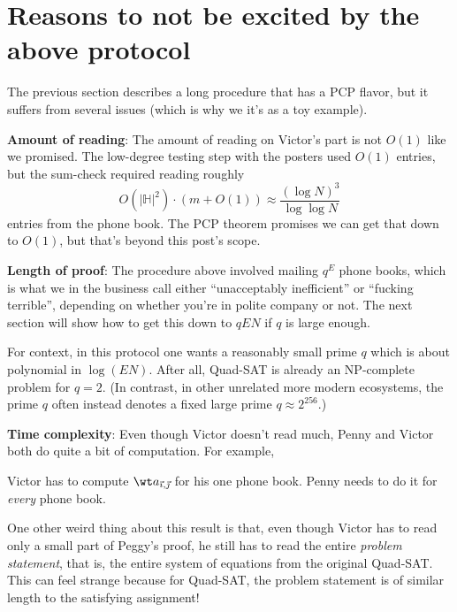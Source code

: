 \documentclass[11pt]{scrreprt}
\begin{document}
\section{Reasons to not be excited by the above protocol}
The previous section describes a long procedure that has a PCP flavor,
but it suffers from several issues (which is why we it's as a toy example).
\begin{itemize}
  \ii \textbf{Amount of reading}:
  The amount of reading on Victor's part is not $O(1)$ like we promised.
  The low-degree testing step with the posters used $O(1)$ entries,
  but the sum-check required reading roughly
  \[ O(|\mathbb H|^2) \cdot (m+O(1)) \approx \frac{(\log N)^3}{\log \log N} \]
  entries from the phone book.
  The PCP theorem promises we can get that down to $O(1)$,
  but that's beyond this post's scope.

  \ii \textbf{Length of proof}:
  The procedure above involved mailing $q^E$ phone books,
  which is what we in the business call either ``unacceptably inefficient''
  or ``fucking terrible'', depending on whether you're in polite company or not.
  The next section will show how to get this down to $qEN$ if $q$ is large enough.

  For context, in this protocol one wants a reasonably small prime $q$
  which is about polynomial in $\log(EN)$.
  After all, Quad-SAT is already an NP-complete problem for $q=2$.
  (In contrast, in other unrelated more modern ecosystems,
  the prime $q$ often instead denotes a fixed large prime $q \approx 2^{256}$.)

  \ii \textbf{Time complexity}:
  Even though Victor doesn't read much,
  Penny and Victor both do quite a bit of computation.
  For example,
  \begin{itemize}
  \ii Victor has to compute $\wt a_{\vec\imath, \vec\jmath}$ for his one phone book.
  \ii Penny needs to do it for \emph{every} phone book.
  \end{itemize}

  \ii One other weird thing about this result is that,
  even though Victor has to read only a small part of Peggy's proof,
  he still has to read the entire \emph{problem statement},
  that is, the entire system of equations from the original Quad-SAT.
  This can feel strange because for Quad-SAT,
  the problem statement is of similar length to the satisfying assignment!

\end{itemize}
\end{document}
